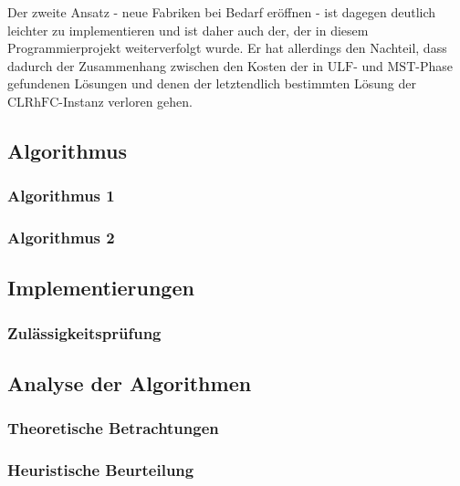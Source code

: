 \documentclass[a4paper,ngerman,12pt,bibtotoc]{scrartcl}
\theoremstyle{definition}
\theoremstyle{plain}
\theoremstyle{remark}
\newcommand{\CLRHFC}{\mathrm{CLRhFC}}
\newcommand{\MST}{\mathrm{MST}}
\newcommand{\ULF}{\mathrm{ULF}}
\begin{document}
	Der zweite Ansatz - neue Fabriken bei Bedarf eröffnen - ist dagegen deutlich leichter zu implementieren und ist daher auch der, der in diesem Programmierprojekt weiterverfolgt wurde. Er hat allerdings den Nachteil, dass dadurch der Zusammenhang zwischen den Kosten der in $\ULF$- und $\MST$-Phase gefundenen Lösungen und denen der letztendlich bestimmten Lösung der $\CLRHFC$-Instanz verloren gehen. 

	\subsection{Algorithmus}
	

	\subsubsection{Algorithmus 1}
	
	\subsubsection{Algorithmus 2}
	

	\subsection{Implementierungen}
	
	\subsubsection{Zulässigkeitsprüfung}
	
	

	\subsection{Analyse der Algorithmen}\label{sec:Analyse}
	
	\subsubsection{Theoretische Betrachtungen}

		
		
	\subsubsection{Heuristische Beurteilung}
	
\end{document}
